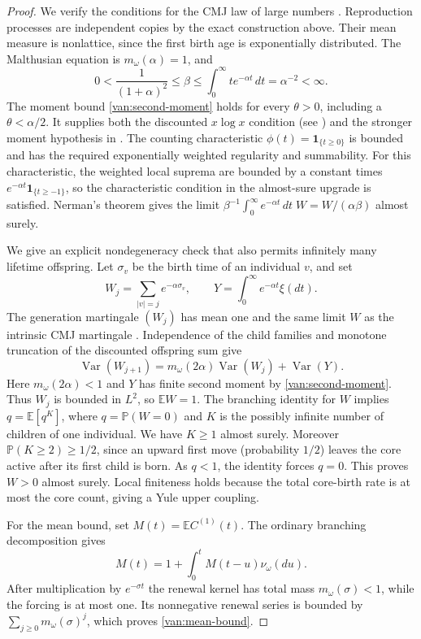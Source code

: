 \begin{proof}
We verify the conditions for the CMJ law of large numbers
\cite[Section~2.2, equation~(2.13) and its almost-sure
upgrade]{IKM2024}.
Reproduction processes are independent copies by the exact
construction above.  Their mean measure is nonlattice, since the
first birth age is exponentially distributed.  The Malthusian
equation is $m_\omega(\alpha)=1$, and
\[
 0<\frac1{(1+\alpha)^2}\le\beta\le
 \int_0^\infty t e^{-\alpha t}\,dt=\alpha^{-2}<\infty.
\]
The moment bound \eqref{van:second-moment} holds for every
$\theta>0$, including a $\theta<\alpha/2$.
It supplies both the discounted $x\log x$ condition
(see \cite{Olofsson1998}) and the stronger
moment hypothesis in \cite[Remark~2.1]{IKM2024}.  The counting
characteristic $\phi(t)=\mathbf1_{\{t\ge0\}}$ is bounded and has the
required exponentially weighted regularity and summability.
For this characteristic, the weighted local suprema are bounded by
a constant times $e^{-\alpha t}\mathbf1_{\{t\ge-1\}}$, so the
characteristic condition in the almost-sure upgrade is satisfied.
Nerman's theorem gives the limit
$\beta^{-1}\int_0^\infty e^{-\alpha t}\,dt\;W
=W/(\alpha\beta)$ almost surely.

We give an explicit nondegeneracy check that also permits infinitely
many lifetime offspring. Let $\sigma_v$ be the birth time of an
individual $v$, and set
\[
 W_j=\sum_{|v|=j}e^{-\alpha\sigma_v},\qquad
 Y=\int_0^\infty e^{-\alpha t}\xi(dt).
\]
The generation martingale $(W_j)$ has mean one and the same limit $W$
as the intrinsic CMJ martingale
\cite[Section~2.2, equation~(2.12)]{IKM2024}. Independence of the child
families and monotone truncation of the discounted offspring sum give
\[
 \operatorname{Var}(W_{j+1})
 =m_\omega(2\alpha)\operatorname{Var}(W_j)+\operatorname{Var}(Y).
\]
Here $m_\omega(2\alpha)<1$ and $Y$ has finite second moment by
\eqref{van:second-moment}. Thus $W_j$ is bounded in $L^2$, so
$\mathbb E W=1$. The branching identity for $W$ implies
$q=\mathbb E[q^K]$, where $q=\mathbb P(W=0)$ and $K$ is the
possibly infinite number of children of one individual. We have
$K\ge1$ almost surely. Moreover $\mathbb P(K\ge2)\ge1/2$, since
an upward first move (probability $1/2$) leaves the core active
after its first child is born. As $q<1$, the identity forces $q=0$.
This proves $W>0$ almost surely. Local finiteness holds because the
total core-birth rate is at most the core count, giving a Yule upper
coupling.

For the mean bound, set $M(t)=\mathbb E C^{(1)}(t)$.
The ordinary branching decomposition gives
\[
 M(t)=1+\int_0^t M(t-u)\nu_\omega(du).
\]
After multiplication by $e^{-\sigma t}$ the renewal kernel has
total mass $m_\omega(\sigma)<1$, while the forcing is at most one.
Its nonnegative renewal series is bounded by
$\sum_{j\ge0}m_\omega(\sigma)^j$, which proves
\eqref{van:mean-bound}.
\end{proof}

